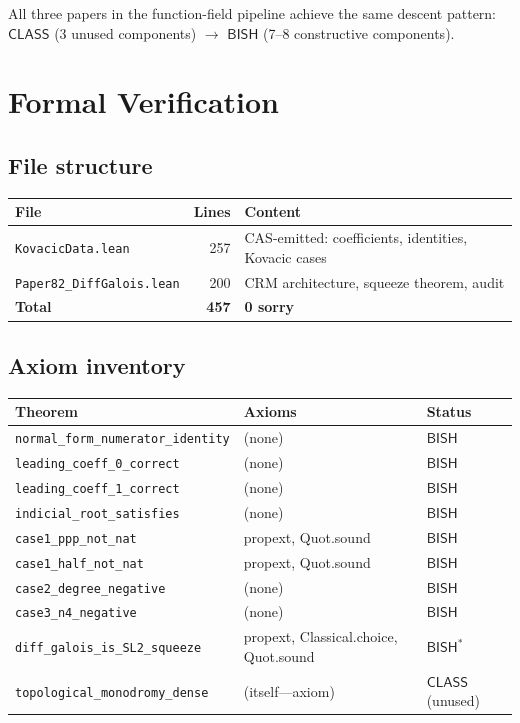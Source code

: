 \documentclass[11pt]{article}
\theoremstyle{plain}
\theoremstyle{definition}
\theoremstyle{remark}
\newcommand{\BISH}{\mathsf{BISH}}
\newcommand{\CLASS}{\mathsf{CLASS}}
\begin{document}
\noindent
All three papers in the function-field pipeline achieve the same descent pattern: $\CLASS$ (3 unused components) $\to$ $\BISH$ (7--8 constructive components).

\section{Formal Verification}
\label{sec:formal}

\subsection{File structure}

\begin{center}
\renewcommand{\arraystretch}{1.05}
\begin{tabular}{@{}lrl@{}}
\toprule
File & Lines & Content \\
\midrule
\texttt{KovacicData.lean} & 257 & CAS-emitted: coefficients, identities, Kovacic cases \\
\texttt{Paper82\_DiffGalois.lean} & 200 & CRM architecture, squeeze theorem, audit \\
\midrule
\textbf{Total} & \textbf{457} & \textbf{0 sorry} \\
\bottomrule
\end{tabular}
\end{center}

\subsection{Axiom inventory}

\begin{center}
\renewcommand{\arraystretch}{1.05}
\begin{tabular}{@{}lll@{}}
\toprule
Theorem & Axioms & Status \\
\midrule
\texttt{normal\_form\_numerator\_identity} & (none) & $\BISH$ \\
\texttt{leading\_coeff\_0\_correct} & (none) & $\BISH$ \\
\texttt{leading\_coeff\_1\_correct} & (none) & $\BISH$ \\
\texttt{indicial\_root\_satisfies} & (none) & $\BISH$ \\
\texttt{case1\_ppp\_not\_nat} & propext, Quot.sound & $\BISH$ \\
\texttt{case1\_half\_not\_nat} & propext, Quot.sound & $\BISH$ \\
\texttt{case2\_degree\_negative} & (none) & $\BISH$ \\
\texttt{case3\_n4\_negative} & (none) & $\BISH$ \\
\texttt{diff\_galois\_is\_SL2\_squeeze} & propext, Classical.choice, Quot.sound & $\BISH^*$ \\
\texttt{topological\_monodromy\_dense} & (itself---axiom) & $\CLASS$ (unused) \\
\bottomrule
\end{tabular}
\end{center}
\end{document}
